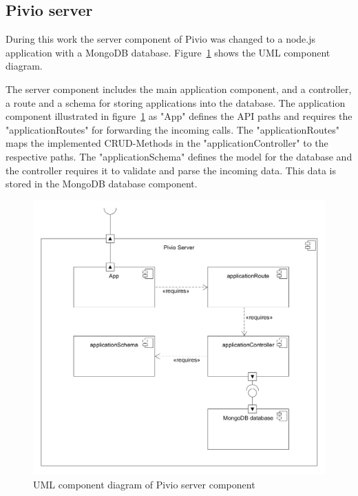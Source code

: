 \subsection{Pivio server}

During this work the server component of Pivio was changed to a node.js application with a MongoDB database. Figure~\ref{fig:pivioserver-component} shows the UML component diagram.

The server component includes the main application component, and a controller, a route and a schema for storing applications into the database. The application component illustrated in figure~\ref{fig:pivioserver-component} as "App" defines the API paths and requires the "applicationRoutes" for forwarding the incoming calls. The "applicationRoutes" maps the implemented CRUD-Methods in the "applicationController" to the respective paths. The "applicationSchema" defines the model for the database and the controller requires it to validate and parse the incoming data. This data is stored in the MongoDB database component. 

\begin{figure}[htpb]
  \centering
  \includegraphics[width=1.0\textwidth]{figures/pivioserver-componentdiagram.PNG}
  \caption{UML component diagram of Pivio server component}
  \label{fig:pivioserver-component}
\end{figure}

